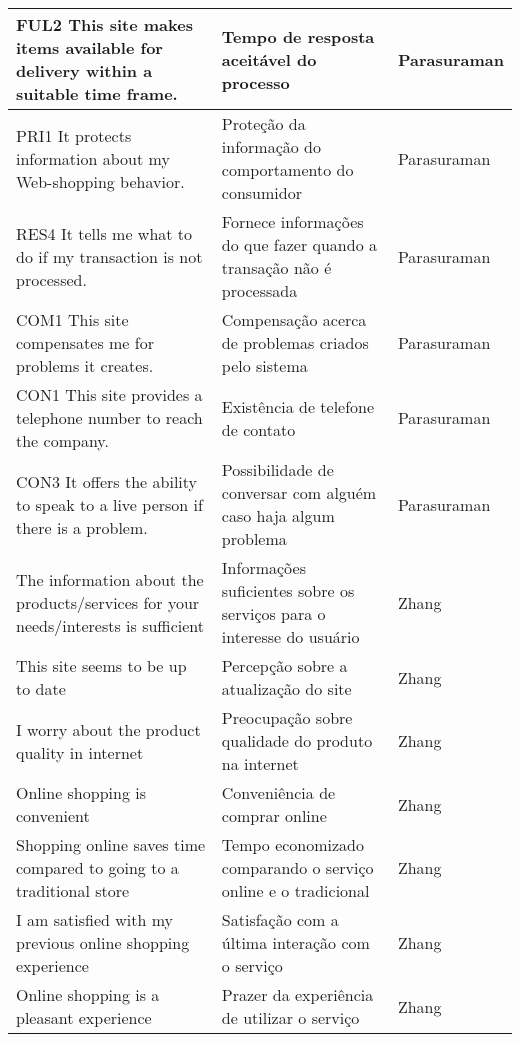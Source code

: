 \begin{apendicesenv}
\begin{table}[]
{\begin{tabular}{|lll|}
\multicolumn{1}{|l|}{FUL2 This site makes items available for delivery within a suitable time frame.} & \multicolumn{1}{l|}{Tempo de resposta aceitável do processo} & Parasuraman \\ \hline
\multicolumn{1}{|l|}{PRI1 It protects information about my Web-shopping behavior.} & \multicolumn{1}{l|}{Proteção da informação do comportamento do consumidor} & Parasuraman \\ \hline
\multicolumn{1}{|l|}{RES4 It tells me what to do if my transaction is not processed.} & \multicolumn{1}{l|}{Fornece informações do que fazer quando a transação não é processada} & Parasuraman \\ \hline
\multicolumn{1}{|l|}{COM1 This site compensates me for problems it creates.} & \multicolumn{1}{l|}{Compensação acerca de problemas criados pelo sistema} & Parasuraman \\ \hline
\multicolumn{1}{|l|}{CON1 This site provides a telephone number to reach the company.} & \multicolumn{1}{l|}{Existência de telefone de contato} & Parasuraman \\ \hline
\multicolumn{1}{|l|}{CON3 It offers the ability to speak to a live person if there is a problem.} & \multicolumn{1}{l|}{Possibilidade de conversar com alguém caso haja algum problema} & Parasuraman \\ \hline
\multicolumn{1}{|l|}{The information about the products/services for your needs/interests is sufficient} & \multicolumn{1}{l|}{Informações suficientes sobre os serviços para o interesse do usuário} & Zhang \\ \hline
\multicolumn{1}{|l|}{This site seems to be up to date} & \multicolumn{1}{l|}{Percepção sobre a atualização do site} & Zhang \\ \hline
\multicolumn{1}{|l|}{I worry about the product quality in internet} & \multicolumn{1}{l|}{Preocupação sobre qualidade do produto na internet} & Zhang \\ \hline
\multicolumn{1}{|l|}{Online shopping is convenient} & \multicolumn{1}{l|}{Conveniência de comprar online} & Zhang \\ \hline
\multicolumn{1}{|l|}{Shopping online saves time compared to going to a traditional store} & \multicolumn{1}{l|}{Tempo economizado comparando o serviço online e o tradicional} & Zhang \\ \hline
\multicolumn{1}{|l|}{I am satisfied with my previous online shopping experience} & \multicolumn{1}{l|}{Satisfação com a última interação com o serviço} & Zhang \\ \hline
\multicolumn{1}{|l|}{Online shopping is a pleasant experience} & \multicolumn{1}{l|}{Prazer da experiência de utilizar o serviço} & Zhang \\ \hline
\end{tabular}%
}
\end{table}


\end{apendicesenv}
